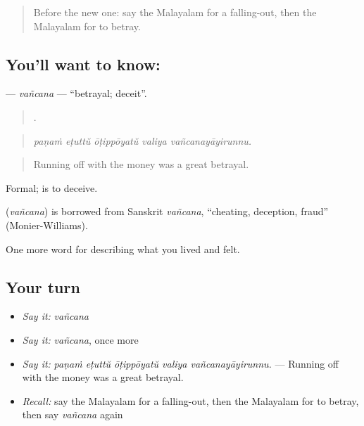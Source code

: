 \label{lesson:ML-C556-vancana}



\begin{quote}
Before the new one: say the Malayalam for a falling-out, then the Malayalam for to betray.
\end{quote}

\subsection*{You'll want to know: }
\textbf{} — \emph{vañcana} — \textquotedblleft{}betrayal; deceit\textquotedblright{}.

\begin{quote}
    .
\end{quote}

\begin{quote}
\emph{paṇaṁ eṭuttŭ ōṭippōyatŭ valiya vañcanayāyirunnu.}
\end{quote}

\begin{quote}
Running off with the money was a great betrayal.
\end{quote}

Formal;  is to deceive.

\begin{cousinweb}
\textbf{} (\emph{vañcana}) is borrowed from Sanskrit \emph{vañcana}, \textquotedblleft{}cheating, deception, fraud\textquotedblright{} (Monier-Williams).
\end{cousinweb}

\begin{grammarlens}[title={What you've built}]
One more word for describing what you lived and felt.
\end{grammarlens}

\subsection*{Your turn}
\begin{itemize}
\raggedright
  \item \emph{Say it:} \emph{vañcana}
  \item \emph{Say it:} \emph{vañcana}, once more
  \item \emph{Say it:} \emph{paṇaṁ eṭuttŭ ōṭippōyatŭ valiya vañcanayāyirunnu.} — Running off with the money was a great betrayal.
  \item \emph{Recall:} say the Malayalam for a falling-out, then the Malayalam for to betray, then say \emph{vañcana} again
\end{itemize}

